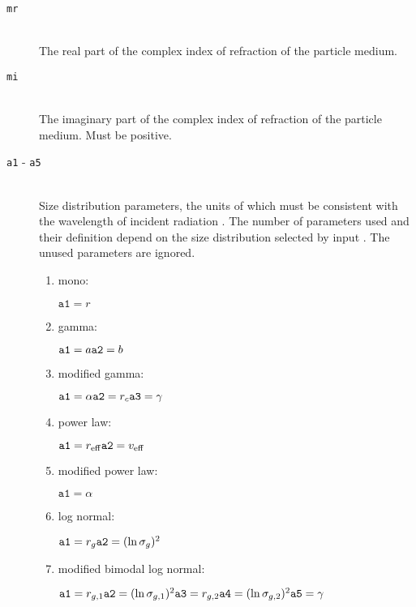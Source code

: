 \begin{description}
\item[\texttt{mr}] \hfill \\
The real part of the complex index of refraction of the particle medium.

\item[\texttt{mi}] \hfill \\
The imaginary part of the complex index of refraction of the particle medium.  Must be positive.

\item[\texttt{a1} - \texttt{a5}] \hfill \\
Size distribution parameters, the units of which must be consistent with the wavelength of incident radiation .  The number of parameters used and their definition depend on the size distribution selected by input .  The unused parameters are ignored.
\begin{enumerate}
\item mono:
\begin{indentall}
\(
\texttt{a1} = r
\)
\end{indentall}
\item gamma:
\begin{indentall}
\(
\texttt{a1} = a \\
\texttt{a2} = b
\)
\end{indentall}
\item modified gamma:
\begin{indentall}
\(
\texttt{a1} = \alpha \\
\texttt{a2} = r_{c} \\
\texttt{a3} = \gamma
\)
\end{indentall}
\item power law:
\begin{indentall}
\(
\texttt{a1} = r_{\mathrm{eff}} \\
\texttt{a2} = v_{\mathrm{eff}}
\)
\end{indentall}
\item modified power law:
\begin{indentall}
\(
\texttt{a1} = \alpha
\)
\end{indentall}
\item log normal:
\begin{indentall}
\(
\texttt{a1} = r_{g} \\
\texttt{a2} = (\ln \sigma_{g})^{2}
\)
\end{indentall}
\item modified bimodal log normal:
\begin{indentall}
\(
\texttt{a1} = r_{g,1} \\
\texttt{a2} = (\ln \sigma_{g,1})^{2} \\
\texttt{a3} = r_{g,2} \\
\texttt{a4} = (\ln \sigma_{g,2})^{2} \\
\texttt{a5} = \gamma
\)
\end{indentall}
\end{enumerate}


\end{description}
